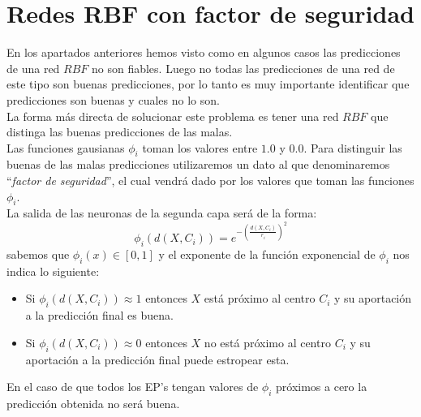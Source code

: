 %
%

\section{Redes RBF con factor de seguridad}

En los apartados anteriores hemos visto como en algunos casos las predicciones
de una red $RBF$ no son fiables. Luego no todas las predicciones de una red de
este tipo son buenas predicciones, por lo tanto es muy importante identificar
que predicciones son buenas y cuales no lo son.\\

La forma m\'as directa de solucionar este problema es tener una red $RBF$ que
distinga las buenas predicciones de las malas.\\

Las funciones gausianas $\phi_i$ toman los valores entre $1.0$ y $0.0$. Para
distinguir las buenas de las malas predicciones utilizaremos un dato al que
denominaremos ``\emph{factor de seguridad}'', el cual vendr\'a dado por los
valores que toman las funciones $\phi_i$.\\

La salida de las neuronas de la segunda capa ser\'a de la forma:
\begin{displaymath}
\phi_i(d(X,C_i)) = e^{-(\frac{d(X,C_i)}{r_i})^2}
\end{displaymath}
sabemos que $\phi_i(x)\in [0,1]$ y el exponente de la funci\'on exponencial
de $\phi_i$ nos indica lo siguiente:
\begin{itemize}
\item Si $\phi_i(d(X,C_i))\approx 1$ entonces $X$ est\'a pr\'oximo al centro
$C_i$ y su aportaci\'on a la predicci\'on final es buena.
\item Si $\phi_i(d(X,C_i))\approx 0$ entonces $X$ no est\'a pr\'oximo al centro
$C_i$ y su aportaci\'on a la predicci\'on final puede estropear esta.
\end{itemize}
En el caso de que todos los EP's tengan valores de $\phi_i$ pr\'oximos a cero la
predicci\'on obtenida no ser\'a buena.\\

